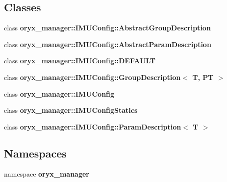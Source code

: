 \subsection*{\-Classes}
\begin{DoxyCompactItemize}
\item 
class {\bf oryx\-\_\-manager\-::\-I\-M\-U\-Config\-::\-Abstract\-Group\-Description}
\item 
class {\bf oryx\-\_\-manager\-::\-I\-M\-U\-Config\-::\-Abstract\-Param\-Description}
\item 
class {\bf oryx\-\_\-manager\-::\-I\-M\-U\-Config\-::\-D\-E\-F\-A\-U\-L\-T}
\item 
class {\bf oryx\-\_\-manager\-::\-I\-M\-U\-Config\-::\-Group\-Description$<$ T, P\-T $>$}
\item 
class {\bf oryx\-\_\-manager\-::\-I\-M\-U\-Config}
\item 
class {\bf oryx\-\_\-manager\-::\-I\-M\-U\-Config\-Statics}
\item 
class {\bf oryx\-\_\-manager\-::\-I\-M\-U\-Config\-::\-Param\-Description$<$ T $>$}
\end{DoxyCompactItemize}
\subsection*{\-Namespaces}
\begin{DoxyCompactItemize}
\item 
namespace {\bf oryx\-\_\-manager}
\end{DoxyCompactItemize}
